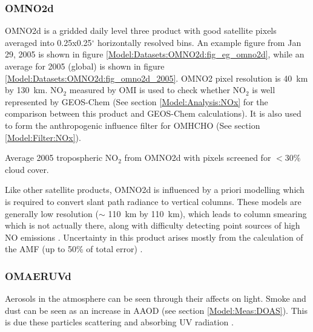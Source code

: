    \subsubsection{OMNO2d}
      \label{Model:Datasets:OMNO2d}
      OMNO2d is a gridded daily level three product with good satellite pixels averaged into 0.25x0.25$^{\circ}$ horizontally resolved bins.
      An example figure from Jan 29, 2005 is shown in figure \ref{Model:Datasets:OMNO2d:fig_eg_omno2d}, while an average for 2005 (global) is shown in figure \ref{Model:Datasets:OMNO2d:fig_omno2d_2005}.
      OMNO2 pixel resolution is 40~km by 130~km.
      NO$_2$ measured by OMI is used to check whether NO$_2$ is well represented by GEOS-Chem (See section \ref{Model:Analysis:NOx} for the comparison between this product and GEOS-Chem calculations).
      It is also used to form the anthropogenic influence filter for OMHCHO (See section \ref{Model:Filter:NOx}).
      
      
      
        {Average 2005 tropospheric NO$_2$ from OMNO2d with pixels screened for $<30\%$ cloud cover.}
        {\label{Model:Datasets:OMNO2d:fig_omno2d_2005}}
      
      Like other satellite products, OMNO2d is influenced by a priori modelling which is required to convert slant path radiance to vertical columns.
      These models are generally low resolution ($\sim$ 110~km by 110~km), which leads to column smearing which is not actually there, along with difficulty detecting point sources of high NO emissions \parencite{Goldberg2018}.
      Uncertainty in this product arises mostly from the calculation of the AMF (up to 50\% of total error) \parencite{Lorente2017}.
    
    \subsubsection{OMAERUVd}
      \label{Model:Datasets:OMAERUVd}
      
      Aerosols in the atmosphere can be seen through their affects on light. 
      Smoke and dust can be seen as an increase in AAOD (see section \ref{Model:Meas:DOAS}).
      This is due these particles scattering and absorbing UV radiation \parencite{Ahn2008}.
      
